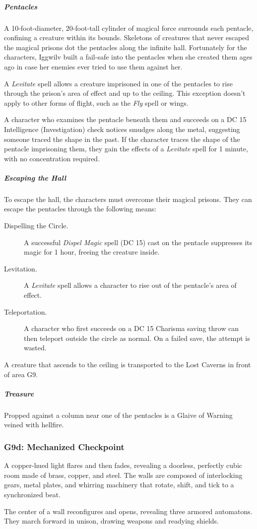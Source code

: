 \documentclass[10pt,a4paper,twoside,bg=print,twocolumn,openany,nodeprecatedcode]{dndbook}
\begin{document}
\subparagraph{Pentacles}
A 10-foot-diameter, 20-foot-tall cylinder of magical force surrounds each pentacle, confining a creature within its bounds. Skeletons of creatures that never escaped the magical prisons dot the pentacles along the infinite hall. Fortunately for the characters, Iggwilv built a fail-safe into the pentacles when she created them ages ago in case her enemies ever tried to use them against her.

A \textit{Levitate} spell allows a creature imprisoned in one of the pentacles to rise through the prison's area of effect and up to the ceiling. This exception doesn't apply to other forms of flight, such as the \textit{Fly} spell or wings.

A character who examines the pentacle beneath them and succeeds on a DC 15 Intelligence (Investigation) check notices smudges along the metal, suggesting someone traced the shape in the past. If the character traces the shape of the pentacle imprisoning them, they gain the effects of a \textit{Levitate} spell for 1 minute, with no concentration required.

\subparagraph{Escaping the Hall}
To escape the hall, the characters must overcome their magical prisons. They can escape the pentacles through the following means:


\begin{description}
\item[Dispelling the Circle.]
A successful \textit{Dispel Magic} spell (DC 15) cast on the pentacle suppresses its magic for 1 hour, freeing the creature inside.
\item[Levitation.]
A \textit{Levitate} spell allows a character to rise out of the pentacle's area of effect.
\item[Teleportation.]
A character who first succeeds on a DC 15 Charisma saving throw can then teleport outside the circle as normal. On a failed save, the attempt is wasted.
\end{description}

A creature that ascends to the ceiling is transported to the Lost Caverns in front of area G9.

\subparagraph{Treasure}
Propped against a column near one of the pentacles is a Glaive of Warning veined with hellfire.

\subsubsection{G9d: Mechanized Checkpoint}
\begin{DndReadAloud}{}
A copper-hued light flares and then fades, revealing a doorless, perfectly cubic room made of brass, copper, and steel. The walls are composed of interlocking gears, metal plates, and whirring machinery that rotate, shift, and tick to a synchronized beat.

The center of a wall reconfigures and opens, revealing three armored automatons. They march forward in unison, drawing weapons and readying shields.

\end{DndReadAloud}
\end{document}
